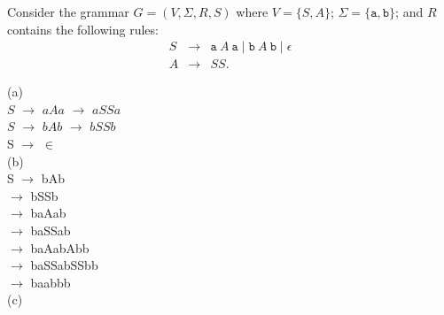 \documentclass[a4page]{exam}
\newcommand{\Str}[1]{\mathtt{#1}}
\begin{document}
\begin{questions}
\question Consider the grammar $G = (V,\Sigma, R, S)$ where $V = \{S,A\}$; $\Sigma = \{\Str{a},\Str{b}\}$; and $R$ contains the following rules:
  \begin{eqnarray*}
    S &\rightarrow& \Str{a}\ A\ \Str{a} \mid \Str{b}\ A\ \Str{b} \mid \epsilon\\
    A &\rightarrow& SS.
  \end{eqnarray*}

(a)
\\
  $S$ $\rightarrow$  $aAa$ $\rightarrow$ $aSSa$ \\
  $S$ $\rightarrow$  $bAb$ $\rightarrow$ $bSSb$ \\
  S $\rightarrow$ $\in$
 \\
(b)
\\
  S $\rightarrow$ bAb\\
  $\rightarrow$ bSSb\\
  $\rightarrow$ baAab\\
  $\rightarrow$ baSSab\\
  $\rightarrow$ baAabAbb\\
  $\rightarrow$ baSSabSSbb\\
  $\rightarrow$ baabbb\\
(c)
\\


\end{questions}
\end{document}
